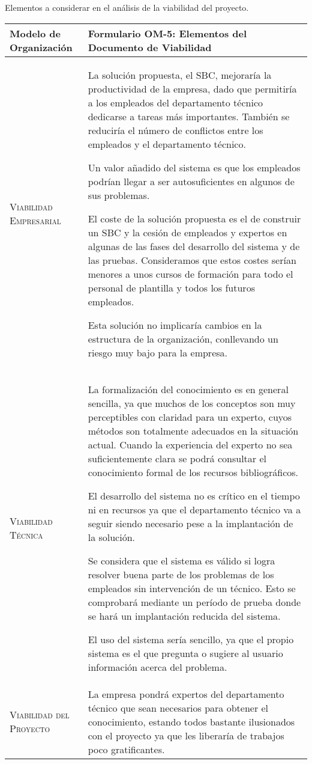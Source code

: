 \documentclass[12pt,a4paper,twoside,spanish]{article}      %
\begin{document}
Elementos a considerar en el análisis de la viabilidad del proyecto.

\begin{table}[H]
\scriptsize
\begin{tabularx}{\textwidth}{|l|X|} \hline


\textbf{Modelo de Organización} & \textbf{Formulario OM-5: Elementos del Documento de Viabilidad}\\ \hline\hline
\textsc{Viabilidad Empresarial} 
& La solución propuesta, el SBC, mejoraría la productividad de la empresa, dado que permitiría a los empleados del departamento técnico dedicarse a tareas más importantes. También se reduciría el número de conflictos entre los empleados y el departamento técnico. 

Un valor añadido del sistema es que los empleados podrían llegar a ser autosuficientes en algunos de sus problemas.

El coste de la solución propuesta es el de construir un SBC y la cesión de empleados y expertos en algunas de las fases del desarrollo del sistema y de las pruebas. Consideramos que estos costes serían menores a unos cursos de formación para todo el personal de plantilla y todos los futuros empleados.

Esta solución no implicaría cambios en la estructura de la organización, conllevando un riesgo muy bajo para la empresa.
\\ \hline
\textsc{Viabilidad Técnica} 
& La formalización del conocimiento es en general sencilla, ya que muchos de los conceptos son muy perceptibles con claridad para un experto, cuyos métodos son totalmente adecuados en la situación actual. Cuando la experiencia del experto no sea suficientemente clara se podrá consultar el conocimiento formal de los recursos bibliográficos.

El desarrollo del sistema no es crítico en el tiempo ni en recursos ya que el departamento técnico va a seguir siendo necesario pese a la implantación de la solución.

Se considera que el sistema es válido si logra resolver buena parte de los problemas de los empleados sin intervención de un técnico. Esto se comprobará mediante un período de prueba donde se hará un implantación reducida del sistema.

El uso del sistema sería sencillo, ya que el propio sistema es el que pregunta o sugiere al usuario información acerca del problema.

\\ \hline
\textsc{Viabilidad del Proyecto} 
& La empresa pondrá expertos del departamento técnico que sean necesarios para obtener el conocimiento, estando todos bastante ilusionados con el proyecto ya que les liberaría de trabajos poco gratificantes.


\end{tabularx}
\end{table}
\end{document}
